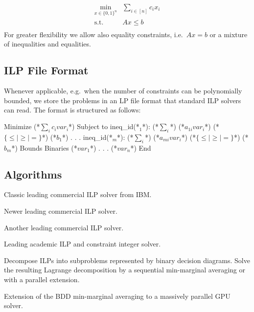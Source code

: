 \begin{equation}
    \tag{ILP}
    \begin{array}{rl}
    \min_{x \in \{0,1\}^n}
    & \sum_{i\in[n]} c_i x_i \\
    \text{s.t.}
    & Ax \leq b \\
    \end{array}
\end{equation}
For greater flexibility we allow also equality constraints, i.e.\  $Ax = b$ or a mixture of inequalities and equalities.

\subsection{ILP File Format}
\label{sec:ilp-file-format}
Whenever applicable, e.g.\ when the number of constraints can be polynomially bounded, we store the problems in an LP file format that standard ILP solvers can read.
The format is structured as follows:

{\small
\begin{fileformat}
Minimize
(*$\sum\limits_i c_i var_i$*)
Subject to
ineq_id(*${}_1$*): (*$\sum\limits_{i}$*) (*$a_{1i} var_{i}$*)  (*$\{\leq|\geq|=\}$*) (*$b_1$*)
.
.
.
ineq_id(*${}_m$*): (*$\sum\limits_{i}$*) (*$a_{mi} var_{i}$*)  (*$\{\leq|\geq|=\}$*) (*$b_m$*)
Bounds
Binaries
(*$var_1$*)
.
.
.
(*$var_n$*)
End
\end{fileformat}
}

\subsection{Algorithms}
\begin{description}[style=unboxed]
\item[CPLEX~\cite{cplex}:] Classic leading commercial ILP solver from IBM.
\item[Gurobi~\cite{gurobi}:] Newer leading commercial ILP solver.
\item[Mosek~\cite{mosek}:] Another leading commercial ILP solver.
\item[SCIP~\cite{achterberg2009scip}:] Leading academic ILP and constraint integer solver.
\item[BDD Min-Marginal Averaging~\cite{lange2021efficient}:]
Decompose ILPs into subproblems represented by binary decision diagrams. Solve the resulting Lagrange decomposition by a sequential min-marginal averaging or with a parallel extension.
\item[Fast Discrete Optimization on GPU (FastDOG)~\cite{abbas2021fastdog}:] Extension of the BDD min-marginal averaging to a massively parallel GPU solver.
\end{description}
